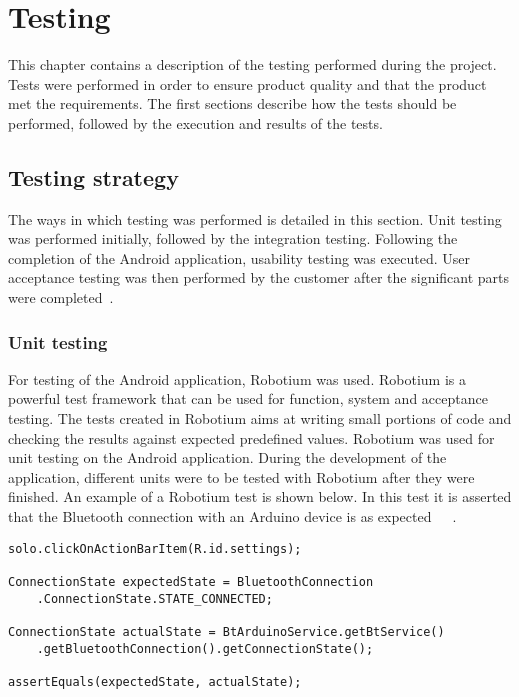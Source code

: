 \chapter{Testing}
	This chapter contains a description of the testing performed during the project. Tests were performed in order to ensure product quality and that the product met the requirements. The first sections describe how the tests should be performed, followed by the execution and results of the tests.
	
	\section{Testing strategy}
		The ways in which testing was performed is detailed in this section. Unit testing was performed initially, followed by the integration testing. Following the completion of the Android application, usability testing was executed. User acceptance testing was then performed by the customer after the significant parts were completed~\cite{testing-overview}.

		\subsection{Unit testing}
			For testing of the Android application, Robotium was used. Robotium is a powerful test framework that can be used for function, system and acceptance testing. The tests created in Robotium aims at writing small portions of code and checking the results against expected predefined values. Robotium was used for unit testing on the Android application. During the development of the application, different units were to be tested with Robotium after they were finished. An example of a Robotium test is shown below. In this test it is asserted that the Bluetooth connection with an Arduino device is as expected~\cite{unit-testing1}~\cite{unit-testing2}~\cite{unit-testing3}.\\

			\begin{lstlisting}
solo.clickOnActionBarItem(R.id.settings);

ConnectionState expectedState = BluetoothConnection
	.ConnectionState.STATE_CONNECTED;
	
ConnectionState actualState = BtArduinoService.getBtService()
	.getBluetoothConnection().getConnectionState();

assertEquals(expectedState, actualState);
			\end{lstlisting}

